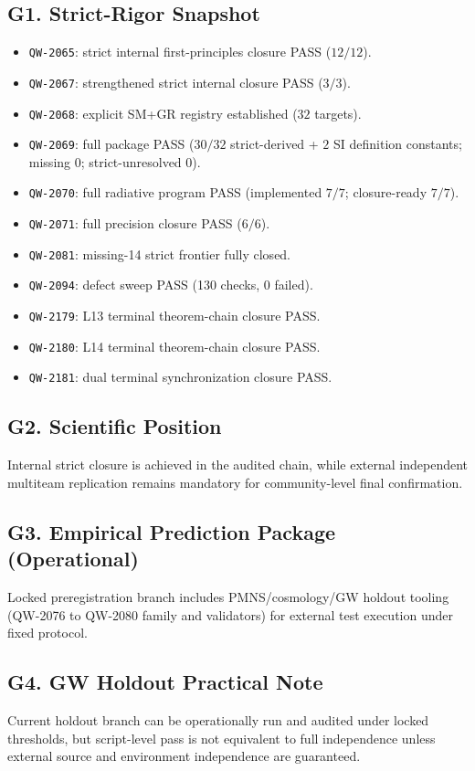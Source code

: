 \documentclass[11pt,a4paper]{article}
\newcommand{\QW}[1]{\texttt{QW-#1}}
\begin{document}
\subsection{G1. Strict-Rigor Snapshot}
\begin{itemize}[leftmargin=1.4em]
    \item \QW{2065}: strict internal first-principles closure PASS ($12/12$).
    \item \QW{2067}: strengthened strict internal closure PASS ($3/3$).
    \item \QW{2068}: explicit SM+GR registry established ($32$ targets).
    \item \QW{2069}: full package PASS ($30/32$ strict-derived + $2$ SI definition constants; missing $0$; strict-unresolved $0$).
    \item \QW{2070}: full radiative program PASS (implemented $7/7$; closure-ready $7/7$).
    \item \QW{2071}: full precision closure PASS ($6/6$).
    \item \QW{2081}: missing-14 strict frontier fully closed.
    \item \QW{2094}: defect sweep PASS (130 checks, 0 failed).
    \item \QW{2179}: L13 terminal theorem-chain closure PASS.
    \item \QW{2180}: L14 terminal theorem-chain closure PASS.
    \item \QW{2181}: dual terminal synchronization closure PASS.
\end{itemize}

\subsection{G2. Scientific Position}
Internal strict closure is achieved in the audited chain, while external independent multiteam replication remains mandatory for community-level final confirmation.

\subsection{G3. Empirical Prediction Package (Operational)}
Locked preregistration branch includes PMNS/cosmology/GW holdout tooling (QW-2076 to QW-2080 family and validators) for external test execution under fixed protocol.

\subsection{G4. GW Holdout Practical Note}
Current holdout branch can be operationally run and audited under locked thresholds, but script-level pass is not equivalent to full independence unless external source and environment independence are guaranteed.
\end{document}
